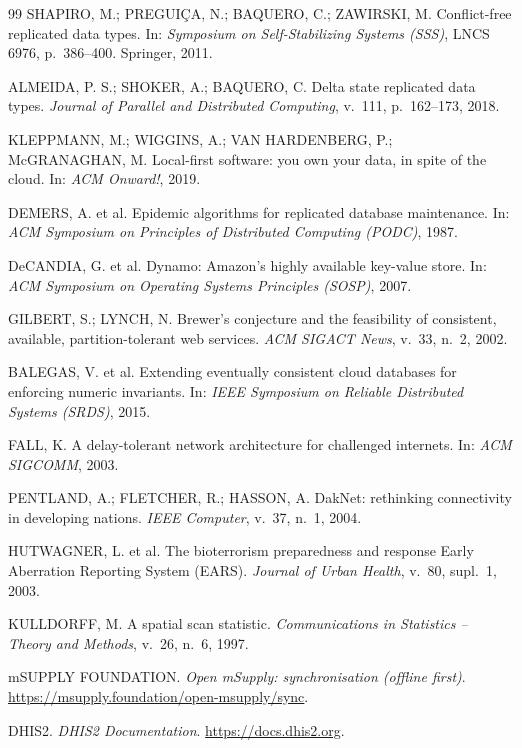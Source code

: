 \documentclass[a4paper,12pt]{article}
\begin{document}
\begin{thebibliography}{99}
 SHAPIRO, M.; PREGUIÇA, N.; BAQUERO, C.; ZAWIRSKI, M.
  Conflict-free replicated data types. In: \textit{Symposium on
  Self-Stabilizing Systems (SSS)}, LNCS 6976, p.~386--400. Springer, 2011.

 ALMEIDA, P. S.; SHOKER, A.; BAQUERO, C. Delta state
  replicated data types. \textit{Journal of Parallel and Distributed
  Computing}, v.~111, p.~162--173, 2018.

 KLEPPMANN, M.; WIGGINS, A.; VAN HARDENBERG, P.;
  McGRANAGHAN, M. Local-first software: you own your data, in spite of the
  cloud. In: \textit{ACM Onward!}, 2019.

 DEMERS, A. et al. Epidemic algorithms for replicated
  database maintenance. In: \textit{ACM Symposium on Principles of Distributed
  Computing (PODC)}, 1987.

 DeCANDIA, G. et al. Dynamo: Amazon's highly available
  key-value store. In: \textit{ACM Symposium on Operating Systems Principles
  (SOSP)}, 2007.

 GILBERT, S.; LYNCH, N. Brewer's conjecture and the
  feasibility of consistent, available, partition-tolerant web services.
  \textit{ACM SIGACT News}, v.~33, n.~2, 2002.

 BALEGAS, V. et al. Extending eventually consistent
  cloud databases for enforcing numeric invariants. In: \textit{IEEE
  Symposium on Reliable Distributed Systems (SRDS)}, 2015.

 FALL, K. A delay-tolerant network architecture for
  challenged internets. In: \textit{ACM SIGCOMM}, 2003.

 PENTLAND, A.; FLETCHER, R.; HASSON, A. DakNet:
  rethinking connectivity in developing nations. \textit{IEEE Computer},
  v.~37, n.~1, 2004.

 HUTWAGNER, L. et al. The bioterrorism preparedness
  and response Early Aberration Reporting System (EARS). \textit{Journal of
  Urban Health}, v.~80, supl.~1, 2003.

 KULLDORFF, M. A spatial scan statistic.
  \textit{Communications in Statistics -- Theory and Methods}, v.~26, n.~6,
  1997.

 mSUPPLY FOUNDATION. \textit{Open mSupply: synchronisation
  (offline first)}. \url{https://msupply.foundation/open-msupply/sync}.

 DHIS2. \textit{DHIS2 Documentation}.
  \url{https://docs.dhis2.org}.

\end{thebibliography}
\end{document}
